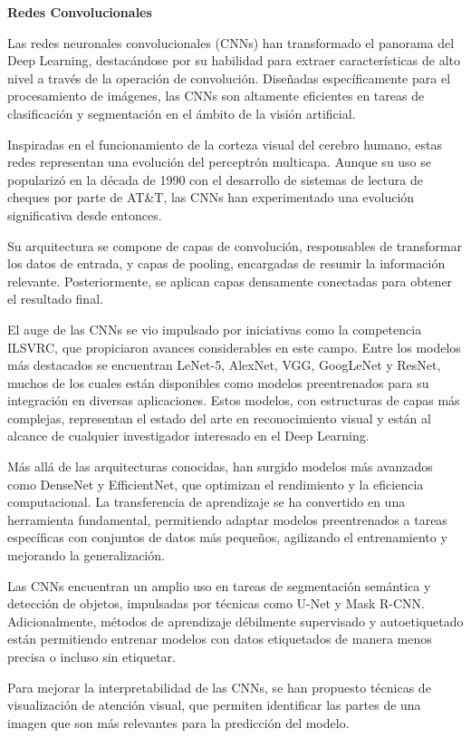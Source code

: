 \documentclass[
  a4paper,
  DIV=11,
  numbers=noendperiod]{scrreprt}
\begin{document}
\textbf{Redes Convolucionales}

Las redes neuronales convolucionales (CNNs) han transformado el panorama
del Deep Learning, destacándose por su habilidad para extraer
características de alto nivel a través de la operación de convolución.
Diseñadas específicamente para el procesamiento de imágenes, las CNNs
son altamente eficientes en tareas de clasificación y segmentación en el
ámbito de la visión artificial.

Inspiradas en el funcionamiento de la corteza visual del cerebro humano,
estas redes representan una evolución del perceptrón multicapa. Aunque
su uso se popularizó en la década de 1990 con el desarrollo de sistemas
de lectura de cheques por parte de AT\&T, las CNNs han experimentado una
evolución significativa desde entonces.

Su arquitectura se compone de capas de convolución, responsables de
transformar los datos de entrada, y capas de pooling, encargadas de
resumir la información relevante. Posteriormente, se aplican capas
densamente conectadas para obtener el resultado final.

El auge de las CNNs se vio impulsado por iniciativas como la competencia
ILSVRC, que propiciaron avances considerables en este campo. Entre los
modelos más destacados se encuentran LeNet-5, AlexNet, VGG, GoogLeNet y
ResNet, muchos de los cuales están disponibles como modelos
preentrenados para su integración en diversas aplicaciones. Estos
modelos, con estructuras de capas más complejas, representan el estado
del arte en reconocimiento visual y están al alcance de cualquier
investigador interesado en el Deep Learning.

Más allá de las arquitecturas conocidas, han surgido modelos más
avanzados como DenseNet y EfficientNet, que optimizan el rendimiento y
la eficiencia computacional. La transferencia de aprendizaje se ha
convertido en una herramienta fundamental, permitiendo adaptar modelos
preentrenados a tareas específicas con conjuntos de datos más pequeños,
agilizando el entrenamiento y mejorando la generalización.

Las CNNs encuentran un amplio uso en tareas de segmentación semántica y
detección de objetos, impulsadas por técnicas como U-Net y Mask R-CNN.
Adicionalmente, métodos de aprendizaje débilmente supervisado y
autoetiquetado están permitiendo entrenar modelos con datos etiquetados
de manera menos precisa o incluso sin etiquetar.

Para mejorar la interpretabilidad de las CNNs, se han propuesto técnicas
de visualización de atención visual, que permiten identificar las partes
de una imagen que son más relevantes para la predicción del modelo.
\end{document}
